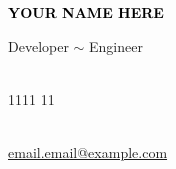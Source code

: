 \documentclass[letterpaper,9pt]{article}
\begin{document}
    
    \begin{minipage}[t]{0.5\textwidth} 
    \vspace{-\baselineskip} 
    
    { \fontsize{16}{20} \textcolor{black}{\textbf{\MakeUppercase{Your Name Here}}}} 
    
    \vspace{6pt}
    
    {\Large Developer $\sim$ Engineer}
  \end{minipage}
  \hfill
  \begin{minipage}[t]{0.2\textwidth} 
    \vspace{-\baselineskip} 
    
    \\ 
     1111 11\\
      \
    
  \end{minipage}
  \begin{minipage}[t]{0.27\textwidth} %
    \vspace{-\baselineskip} %
    
    \faEnvelope{} \href{mailto:email@example.com}{email.email@example.com}\	
      \
      \    
      
  \end{minipage}
  \vspace*{7mm}
     
\end{document}
